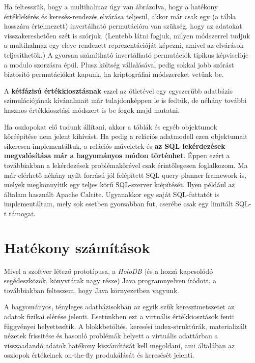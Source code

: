 \documentclass[
    parspace,
    noindent,
    nohyp,
]{elteiktdk}[2023/04/10]
\begin{document}
Ha feltesszük, hogy a multihalmaz úgy van ábrázolva,
hogy a hatékony értéklekérés és keresés-rendezés elvárása teljesül,
akkor már csak egy (a tábla hosszára értelmezett) invertálható permutációra van szükség,
hogy az adatokat visszakereshetően szét is szórjuk.
(Lentebb látni fogjuk, milyen módszerrel tudjuk a multihalmaz egy eleve rendezett reprezentációját képezni,
amivel az elvárások teljesíthetők.)
A gyorsan számítható invertálható permutációk tipikus képviselője a modulo szorzásra épül.
Plusz költség vállalásával pedig sokkal jobb szórást biztosító permutációkat kapunk,
ha kriptográfiai módszereket vetünk be.

A \textbf{kétfázisú értékkiosztásnak} ezzel az ötletével
egy egyszerűbb adatbázis szimulációjának kívánalmait már tulajdonképpen le is fedtük,
de néhány további hasznos értékkiosztási módszert is be fogok majd mutatni.

Ha oszlopokat elő tudunk állítani,
akkor a táblák és egyéb objektumok köréépítése nem jelent kihívást.
Ha pedig a relációs adatmodell ezen objektumait sikeresen implementáltuk,
a relációs műveletek és \textbf{az SQL lekérdezések megvalósítása már a hagyományos módon történhet}.
Éppen ezért a továbbiakban a lekérdezések problémakörével csak érintőlegesen foglalkozom.
Ma már elérhető néhány nyílt forrású jól felépített SQL query planner framework is,
melyek megkönnyítik egy teljes körű SQL-szerver kiépítését.
Ilyen például az általam használt Apache Calcite.
Ugyanakkor egy saját SQL-futtatót is implementáltam, mely sok esetben gyorsabban fut,
cserébe csak egy limitált SQL-t támogat.

\section{Hatékony számítások}

Mivel a szoftver létező prototípusa, a \textit{HoloDB}
(és a hozzá kapcsolódó segédeszközök, könyvtárak nagy része) Java programnyelven íródott,
a továbbiakban felteszem, hogy Java környezetben vagyunk.

A hagyományos, tényleges adatbázisokban az egyik szűk keresztmetszetet
az adatok fizikai elérése jelenti.
Esetünkben ezt a virtuális értékkiosztások fenti függvényei helyettesítik.
A blokkbetöltés, keresési index-struktúrák, materializált nézetek frissítése
és hasonló problémák helyett a virtuális adattárban
a visszaadandó adatok hatékony kiszámítását kell megoldani,
ami általában az oszlopok értékeinek on-the-fly produkálását és keresését jelenti.
\end{document}
